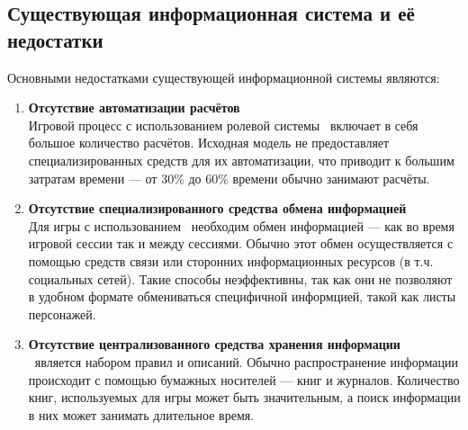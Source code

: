 \subsection{Существующая информационная система и её недостатки}


Основными недостатками существующей информационной системы являются:
\begin{enumerate}
\item \textbf{Отсутствие автоматизации расчётов}\\
Игровой процесс с использованием ролевой системы \dnd\ включает в себя большое количество расчётов. Исходная модель не предоставляет специализированных средств для их автоматизации, что приводит к большим затратам времени --- от 30\% до 60\% времени обычно занимают расчёты.
\item \textbf{Отсутствие специализированного средства обмена информацией}\\
Для игры с использованием \dnd\ необходим обмен информацией --- как во время игровой сессии так и между сессиями. Обычно этот обмен осуществляется с помощью средств связи или сторонних информационных ресурсов (в т.ч. социальных сетей). Такие способы неэффективны, так как они не позволяют в удобном формате обмениваться специфичной информцией, такой как листы персонажей.
\item \textbf{Отсутствие централизованного средства хранения информации}\\
\dnd\ является набором правил и описаний. Обычно распространение информации происходит с помощью бумажных носителей --- книг и журналов. Количество книг, используемых для игры может быть значительным, а поиск информации в них может занимать длительное время.
\end{enumerate}
